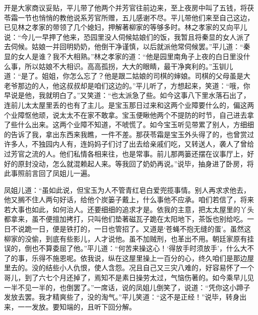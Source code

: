 \begin{parag}
    开是大家商议妥贴，平儿带了他两个并芳官往前边来，至上夜房中叫了五钱，将茯苓霜一节也悄悄的教他说系芳官所赠，五儿感谢不尽。平儿带他们来至自己这边，已见林之孝家的带领了几个媳妇，押解著柳家的等够多时。林之孝家的又向平儿说：“今儿一早押了他来，恐园里没人伺候姑娘们的饭，我暂且将秦显的女人派了去伺候。姑娘一并回明奶奶，他倒干净谨慎，以后就派他常伺候罢。”平儿道：“秦显的女人是谁？我不大相熟。”林之孝家的道：“他是园里南角子上夜的白日里没什么事，所以姑娘不大相识。高高孤拐，大大的眼睛，最干净爽利的。”玉钏儿道：“是了。姐姐，你怎么忘了？他是跟二姑娘的司棋的婶娘。司棋的父母虽是大老爷那边的人，他这叔叔却是咱们这边的。”平儿听了，方想起来，笑道：“哦，你早说是他，我就明白了。”又笑道：“也太派急了些。如今这事八下里水落石出了，连前儿太太屋里丢的也有了主儿。是宝玉那日过来和这两个业障要什么的，偏这两个业障怄他顽，说太太不在家不敢拿。宝玉便瞅他两个不提防的时节，自己进去拿了些什么出来。这两个业障不知道，不唬慌了。如今宝玉听见带累了别人，方细细的告诉了我，拿出东西来我瞧，一件不差。那茯苓霜是宝玉外头得了的，也曾赏过许多人，不独园内人有，连妈妈子们讨了出去给亲戚们吃，又转送人，袭人了曾给过芳官之流的人。他们私情各相来往，也是常事。前儿那两篓还摆在议事厅上，好好的原封没动，怎么就混赖起人来。等我回了奶奶再说。”说毕，抽身进了卧房，将此事照前言回了凤姐儿一遍。
\end{parag}


\begin{parag}
    凤姐儿道：“虽如此说，但宝玉为人不管青红皂白爱兜揽事情。别人再求求他去，他又搁不住人两句好话，给他个炭篓子戴上，什么事他不应承。咱们若信了，将来若大事也如此，如何治人。还要细细的追求才是。依我的主意，把太太屋里的丫头都拿来，虽不便擅加拷打，只叫他们垫著磁瓦子跪在太阳地下，茶饭也别给吃。一日不说跪一日，便是铁打的，一日也管招了。又道是‘苍蝇不抱无缝的蛋’。虽然这柳家的没偷，到底有些影儿，人才说他。虽不加贼刑，也革出不用。朝廷家原有挂误的，倒也不算委屈了他。”平儿道：“何苦来操这心！‘得放手时须放手’，什么大不了的事，乐得不施恩呢。依我说，纵在这屋里操上一百分的心，终久咱们是那边屋里去的。没的结些小人仇恨，使人含怨。况且自己又三灾八难的，好容易怀了一个哥儿，到了六七个月还掉了，焉知不是素日操劳太过，气恼伤著的。如今乘早儿见一半不见一半的，也倒罢了。”一席话，说的凤姐儿倒笑了，说道：“凭你这小蹄子发放去罢。我才精爽些了，没的淘气。”平儿笑道：“这不是正经！”说毕，转身出来，一一发放。要知端的，且听下回分解。
\end{parag}
